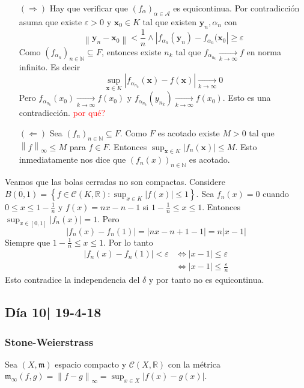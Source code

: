 \documentclass[12pt]{article}
\theoremstyle{plain}
\theoremstyle{definition}
\theoremstyle{remark}
\numberwithin{equation}{section}
\newcommand{\bN}{\mathbb{N}}        %
\newcommand{\bR}{\mathbb{R}}        %
\newcommand{\cA}{\mathcal{A}}       %
\newcommand{\cC}{\mathcal{C}}       %
\newcommand{\mm}{\mathfrak{m}}      %
\renewcommand{\geq}{\geqslant}      %
\renewcommand{\leq}{\leqslant}      %
\renewcommand{\:}{\colon}           %
\renewcommand{\vec}[1]{\mathbf{#1}}
\newcommand{\vx}{\vec{x}}           %
\newcommand{\vy}{\vec{y}}
\newcommand{\conj}[1]{\left\lbrace#1\right\rbrace}
\newcommand{\bonj}[1]{\left\lbrack#1\right\rbrack}
\newcommand{\nm}[1]{\left\|#1\right\|} %
\begin{document}
\begin{multicols}{2}
 \begin{ptcbp}
 \begin{enumerate}
   \item[$(\Rightarrow)$] Hay que verificar que $(f_\alpha)_{\alpha\in\cA}$ es equicontinua. Por contradicción asuma que existe $\varepsilon>0$ y $\vx_0\in K$ tal que existen $\vy_n,\alpha_n$ con
       $$\nm{\vy_n-\vx_0}<\frac{1}{n}\land |f_{\alpha_n}(\vy_n)-f_{\alpha_n}(\vx_0|\geq\varepsilon$$
       Como $(f_{\alpha_n})_{n\in\bN}\subseteq F$, entonces existe $n_k$ tal que $f_{\alpha_{n_k}}\xrightarrow[k\to\infty]{} f$ en norma infinito. Es decir
       $$\sup_{\vx\in K}|f_{\alpha_{n_k}}(\vx)-f(\vx)|\xrightarrow[k\to\infty]{} 0$$
       Pero $f_{\alpha_{n_k}}(x_0)\xrightarrow[k\to\infty]{}f(x_0)$ y $f_{\alpha_{n_k}}(y_{n_k})\xrightarrow[k\to\infty]{}f(x_0)$. Esto es una contradicción. \textcolor{red}{por qué?}
   \item[$(\Leftarrow)$] Sea $(f_n)_{n\in\bN}\subseteq F$. Como $F$ es acotado existe $M>0$ tal que $\nm{f}_\infty\leq M$ para $f\in F$. Entonces $\sup_{\vx\in K}|f_n(\vx)|\leq M$. Esto inmediatamente nos dice que $(f_n(x))_{n\in\bN}$ es acotado.
 \end{enumerate}
 \end{ptcbp}

 Veamos que las bolas cerradas no son compactas.
 Considere $\overline{B(0,1)}=\conj{f\in\cC(K,\bR)\colon \sup_{x\in K}|f(x)|\leq 1}$. Sea $f_n(x)= 0$ cuando $0\leq x\leq 1-\frac{1}{n}$ y $f(x)=nx-n-1$ si $1-\frac{1}{n}\leq x\leq 1$. Entonces $\sup_{x\in\bonj{0,1}}|f_n(x)|=1$. Pero
 $$|f_n(x)-f_n(1)|=|nx-n+1-1|=n|x-1|$$
 Siempre que $1-\frac{1}{n}\leq x\leq 1$. Por lo tanto
 \begin{align*}
   |f_n(x)-f_n(1)|<\varepsilon &\iff |x-1|\leq\varepsilon \\
    &\iff |x-1|\leq \frac{\varepsilon}{n}
 \end{align*}
 Esto contradice la independencia del $\delta$ y por tanto no es equicontinua.

 \subsection{Día 10| 19-4-18}

 \subsubsection*{Stone-Weierstrass}


 Sea $(X,\mm)$ espacio compacto y $\cC(X,\bR)$ con la métrica $\mm_{\infty}(f,g)=\nm{f-g}_\infty=\sup_{x\in X}|f(x)-g(x)|$.


\end{multicols}
\end{document}
